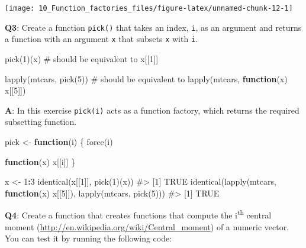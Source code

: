 \documentclass[
]{krantz}
\makeatletter
\newenvironment{Shaded}{\begin{snugshade}}{\end{snugshade}}
\newcommand{\CommentTok}[1]{\textcolor[rgb]{0.56,0.35,0.01}{\textit{#1}}}
\newcommand{\ControlFlowTok}[1]{\textcolor[rgb]{0.13,0.29,0.53}{\textbf{#1}}}
\newcommand{\DecValTok}[1]{\textcolor[rgb]{0.00,0.00,0.81}{#1}}
\newcommand{\KeywordTok}[1]{\textcolor[rgb]{0.13,0.29,0.53}{\textbf{#1}}}
\newcommand{\NormalTok}[1]{#1}
\newcommand{\OperatorTok}[1]{\textcolor[rgb]{0.81,0.36,0.00}{\textbf{#1}}}
\newcommand{\StringTok}[1]{\textcolor[rgb]{0.31,0.60,0.02}{#1}}
\renewcommand{\href}[2]{#2 (\url{#1})}
\newenvironment{kframe}{%
\medskip{}
\setlength{\fboxsep}{.8em}
 \def\at@end@of@kframe{}%
 \ifinner\ifhmode%
  \def\at@end@of@kframe{\end{minipage}}%
  \begin{minipage}{\columnwidth}%
 \fi\fi%
 \def\FrameCommand##1{\hskip\@totalleftmargin \hskip-\fboxsep
 \colorbox{shadecolor}{##1}\hskip-\fboxsep
     \hskip-\linewidth \hskip-\@totalleftmargin \hskip\columnwidth}%
 \MakeFramed {\advance\hsize-\width
   \@totalleftmargin\z@ \linewidth\hsize
   \@setminipage}}%
 {\par\unskip\endMakeFramed%
 \at@end@of@kframe}
\renewenvironment{Shaded}{\begin{kframe}}{\end{kframe}}
\renewcommand{\KeywordTok} [1]{\textcolor[rgb]{0.00,0.44,0.13}{{#1}}}
\renewcommand{\DecValTok}  [1]{\textcolor[rgb]{0.25,0.63,0.44}{{#1}}}
\renewcommand{\StringTok}  [1]{\textcolor[rgb]{0.25,0.44,0.63}{{#1}}}
\renewcommand{\CommentTok} [1]{\textcolor[rgb]{0.38,0.63,0.69}{{#1}}}
\renewcommand{\NormalTok}  [1]{{#1}}
\makeatother
\begin{document}
\begin{center}\texttt{[image: 10\_Function\_factories\_files/figure-latex/unnamed-chunk-12-1]} \end{center}

\textbf{{Q3}}: Create a function \texttt{pick()} that takes an index, \texttt{i}, as an argument and returns a function with an argument \texttt{x} that subsets \texttt{x} with \texttt{i}.

\begin{Shaded}
\begin{Highlighting}[]
\KeywordTok{pick}\NormalTok{(}\DecValTok{1}\NormalTok{)(x)}
\CommentTok{# should be equivalent to}
\NormalTok{x[[}\DecValTok{1}\NormalTok{]]}

\KeywordTok{lapply}\NormalTok{(mtcars, }\KeywordTok{pick}\NormalTok{(}\DecValTok{5}\NormalTok{))}
\CommentTok{# should be equivalent to}
\KeywordTok{lapply}\NormalTok{(mtcars, }\ControlFlowTok{function}\NormalTok{(x) x[[}\DecValTok{5}\NormalTok{]])}
\end{Highlighting}
\end{Shaded}

\textbf{{A}}: In this exercise \texttt{pick(i)} acts as a function factory, which returns the required subsetting function.

\begin{Shaded}
\begin{Highlighting}[]
\NormalTok{pick <-}\StringTok{ }\ControlFlowTok{function}\NormalTok{(i) \{}
  \KeywordTok{force}\NormalTok{(i)}
  
  \ControlFlowTok{function}\NormalTok{(x) x[[i]]}
\NormalTok{\}}

\NormalTok{x <-}\StringTok{ }\DecValTok{1}\OperatorTok{:}\DecValTok{3}
\KeywordTok{identical}\NormalTok{(x[[}\DecValTok{1}\NormalTok{]], }\KeywordTok{pick}\NormalTok{(}\DecValTok{1}\NormalTok{)(x))}
\CommentTok{#> [1] TRUE}
\KeywordTok{identical}\NormalTok{(}\KeywordTok{lapply}\NormalTok{(mtcars, }\ControlFlowTok{function}\NormalTok{(x) x[[}\DecValTok{5}\NormalTok{]]),}
          \KeywordTok{lapply}\NormalTok{(mtcars, }\KeywordTok{pick}\NormalTok{(}\DecValTok{5}\NormalTok{)))}
\CommentTok{#> [1] TRUE}
\end{Highlighting}
\end{Shaded}

\textbf{{Q4}}: Create a function that creates functions that compute the i\textsuperscript{th} \href{http://en.wikipedia.org/wiki/Central_moment}{central moment} of a numeric vector. You can test it by running the following code:
\end{document}
